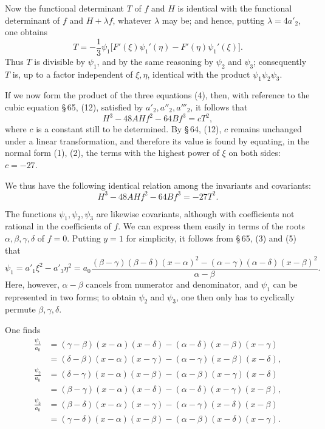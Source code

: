 \documentclass[11pt]{article}
\begin{document}
Now the functional determinant $T$ of $f$ and $H$ is identical with the functional determinant of $f$ and $H+\lambda f$, whatever $\lambda$ may be; and hence, putting $\lambda=4a'_2$, one obtains
\[
 T=-\frac13\psi_1\bigl[F'(\xi)\psi_1'(\eta)-F'(\eta)\psi_1'(\xi)\bigr].
\]
Thus $T$ is divisible by $\psi_1$, and by the same reasoning by $\psi_2$ and $\psi_3$; consequently $T$ is, up to a factor independent of $\xi,\eta$, identical with the product $\psi_1\psi_2\psi_3$.

If we now form the product of the three equations (4), then, with reference to the cubic equation \S\,65, (12), satisfied by $a'_2,a''_2,a'''_2$, it follows that
\[
 H^3-48AHf^2-64Bf^3=cT^2,
\]
where $c$ is a constant still to be determined. By \S\,64, (12), $c$ remains unchanged under a linear transformation, and therefore its value is found by equating, in the normal form (1), (2), the terms with the highest power of $\xi$ on both sides: $c=-27$.

We thus have the following identical relation among the invariants and covariants:
\begin{equation}
 H^3-48AHf^2-64Bf^3=-27T^2.
\tag{5}
\end{equation}

The functions $\psi_1,\psi_2,\psi_3$ are likewise covariants, although with coefficients not rational in the coefficients of $f$. We can express them easily in terms of the roots $\alpha,\beta,\gamma,\delta$ of $f=0$. Putting $y=1$ for simplicity, it follows from \S\,65, (3) and (5) that
\[
 \psi_1=a'_1\xi^2-a'_3\eta^2
 =a_0\frac{(\beta-\gamma)(\beta-\delta)(x-\alpha)^2-(\alpha-\gamma)(\alpha-\delta)(x-\beta)^2}{\alpha-\beta}.
\]
Here, however, $\alpha-\beta$ cancels from numerator and denominator, and $\psi_1$ can be represented in two forms; to obtain $\psi_2$ and $\psi_3$, one then only has to cyclically permute $\beta,\gamma,\delta$.

One finds
\begin{equation}
\begin{aligned}
 \frac{\psi_1}{a_0}
 &= (\gamma-\beta)(x-\alpha)(x-\delta)-(\alpha-\delta)(x-\beta)(x-\gamma)\\
 &= (\delta-\beta)(x-\alpha)(x-\gamma)-(\alpha-\gamma)(x-\beta)(x-\delta),\\[0.4em]
 \frac{\psi_2}{a_0}
 &= (\delta-\gamma)(x-\alpha)(x-\beta)-(\alpha-\beta)(x-\gamma)(x-\delta)\\
 &= (\beta-\gamma)(x-\alpha)(x-\delta)-(\alpha-\delta)(x-\gamma)(x-\beta),\\[0.4em]
 \frac{\psi_3}{a_0}
 &= (\beta-\delta)(x-\alpha)(x-\gamma)-(\alpha-\gamma)(x-\delta)(x-\beta)\\
 &= (\gamma-\delta)(x-\alpha)(x-\beta)-(\alpha-\beta)(x-\delta)(x-\gamma).
\end{aligned}
\tag{6}
\end{equation}
\end{document}
